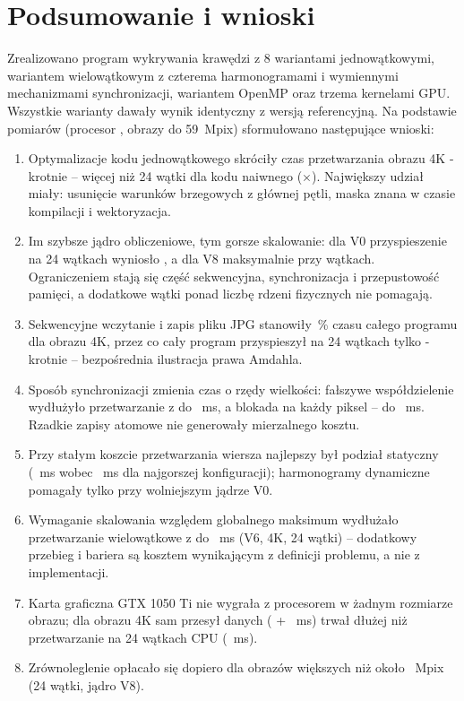 \documentclass[12pt,a4paper]{article}
\begin{document}
\section{Podsumowanie i wnioski}

Zrealizowano program wykrywania krawędzi z 8 wariantami jednowątkowymi, wariantem wielowątkowym z czterema harmonogramami i wymiennymi mechanizmami synchronizacji, wariantem OpenMP oraz trzema kernelami GPU. Wszystkie warianty dawały wynik identyczny z wersją referencyjną. Na podstawie pomiarów (procesor , obrazy do 59~Mpix) sformułowano następujące wnioski:
\begin{enumerate}
	\item Optymalizacje kodu jednowątkowego skróciły czas przetwarzania obrazu 4K -krotnie -- więcej niż 24 wątki dla kodu naiwnego ($\times$). Największy udział miały: usunięcie warunków brzegowych z głównej pętli, maska znana w czasie kompilacji i wektoryzacja.
	\item Im szybsze jądro obliczeniowe, tym gorsze skalowanie: dla V0 przyspieszenie na 24 wątkach wyniosło , a dla V8 maksymalnie  przy  wątkach. Ograniczeniem stają się część sekwencyjna, synchronizacja i przepustowość pamięci, a dodatkowe wątki ponad liczbę rdzeni fizycznych nie pomagają.
	\item Sekwencyjne wczytanie i zapis pliku JPG stanowiły \,\% czasu całego programu dla obrazu 4K, przez co cały program przyspieszył na 24 wątkach tylko -krotnie -- bezpośrednia ilustracja prawa Amdahla.
	\item Sposób synchronizacji zmienia czas o rzędy wielkości: fałszywe współdzielenie wydłużyło przetwarzanie z  do ~ms, a blokada na każdy piksel -- do ~ms. Rzadkie zapisy atomowe nie generowały mierzalnego kosztu.
	\item Przy stałym koszcie przetwarzania wiersza najlepszy był podział statyczny (~ms wobec ~ms dla najgorszej konfiguracji); harmonogramy dynamiczne pomagały tylko przy wolniejszym jądrze V0.
	\item Wymaganie skalowania względem globalnego maksimum wydłużało przetwarzanie wielowątkowe z  do ~ms (V6, 4K, 24 wątki) -- dodatkowy przebieg i bariera są kosztem wynikającym z definicji problemu, a nie z implementacji.
	\item Karta graficzna GTX 1050 Ti nie wygrała z procesorem w żadnym rozmiarze obrazu; dla obrazu 4K sam przesył danych ( + ~ms) trwał dłużej niż przetwarzanie na 24 wątkach CPU (~ms).
	\item Zrównoleglenie opłacało się dopiero dla obrazów większych niż około ~Mpix (24 wątki, jądro V8).
\end{enumerate}
\end{document}
